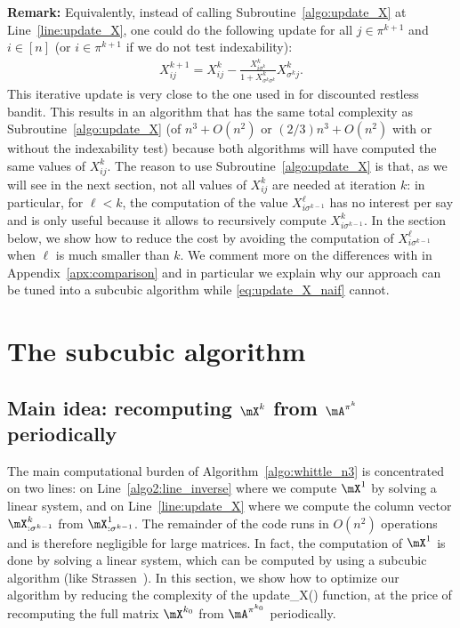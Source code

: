 \textbf{Remark:} Equivalently, instead of calling Subroutine~\ref{algo:update_X} at Line~\ref{line:update_X}, one could do the following update for all $j\in\pi^{k+1}$ and $i\in[n]$ (or $i\in\pi^{k+1}$ if we do not test indexability):
\begin{align}
    X_{ij}^{k+1} = X_{ij}^{k} -\displaystyle\frac{X^{k}_{i\sigma^{k}}}{1+X^{k}_{\sigma^{k}\sigma^{k}}}X^{k}_{\sigma^{k}j}. \label{eq:update_X_naif}
\end{align}
This iterative update is very close to the one used in \cite{akbarzadeh2020conditions,nino2020fast} for discounted restless bandit. This results in an algorithm that has the same total complexity as Subroutine~\ref{algo:update_X} (of $n^3+O(n^2)$ or $(2/3)n^3+O(n^2)$ with or without the indexability test) because both algorithms will have computed the same values of $X^{k}_{ij}$. The reason to use Subroutine~\ref{algo:update_X} is that, as we will see in the next section, not all values of $X^{k}_{ij}$ are needed at iteration $k$: in particular, for $\ell<k$, the computation of the value $X^\ell_{i\sigma^{k-1}}$ has no interest per say and is only useful because it allows to recursively compute $X^{k}_{i\sigma^{k-1}}$. In the section below, we show how to reduce the cost by avoiding the computation of $X^\ell_{i\sigma^{k-1}}$ when $\ell$ is much smaller than $k$. We comment more on the differences with \cite{akbarzadeh2020conditions,nino2020fast} in Appendix~\ref{apx:comparison} and in particular we explain why our approach can be tuned into a subcubic algorithm while \eqref{eq:update_X_naif} cannot.

\section{The subcubic algorithm}
\label{sec:subcubic algorithm}

\subsection{Main idea: recomputing \texorpdfstring{$\mX^{k}$ from $\mA^{\pi^k}$}{Xk from Apik} periodically}

The main computational burden of Algorithm~\ref{algo:whittle_n3} is concentrated on two lines: on Line~\ref{algo2:line_inverse} where we compute $\mX^1$ by solving a linear system, and on Line~\ref{line:update_X} where we compute the column vector $\mX^{k}_{:\sigma^{k-1}}$ from $\mX^1_{: \sigma^{k-1}}$. The remainder of the code runs in $O(n^2)$ operations and is therefore negligible for large matrices. In fact, the computation of $\mX^1$ is done by solving a linear system, which can be computed by using a subcubic algorithm (like Strassen~\cite{strassen1969gaussian}). In this section, we show how to optimize our algorithm by reducing the complexity of the update\_X() function, at the price of recomputing the full matrix $\mX^{k_0}$ from $\mA^{\pi^{k_0}}$ periodically.

